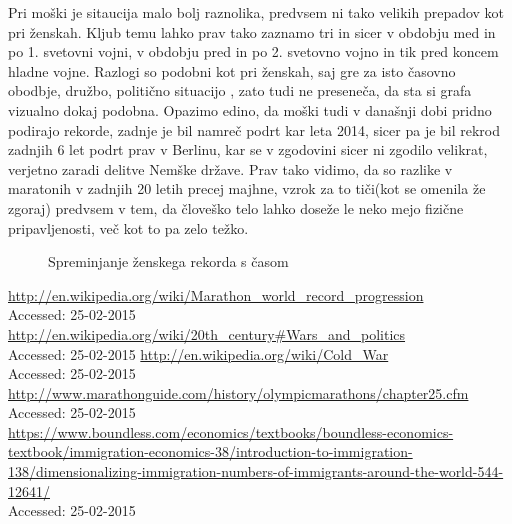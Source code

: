 \documentclass[11pt,a4paper]{article}
\begin{document}
Pri moški je sitaucija malo bolj raznolika, predvsem ni tako velikih prepadov kot pri ženskah. Kljub temu lahko prav tako zaznamo tri in sicer v obdobju med in po 1. svetovni vojni, v obdobju pred in po 2. svetovno vojno in tik pred koncem hladne vojne. Razlogi so podobni kot pri ženskah, saj gre za isto časovno obodbje, družbo, politično situacijo , zato tudi ne preseneča, da sta si grafa vizualno dokaj podobna. Opazimo edino, da moški tudi v današnji dobi pridno podirajo rekorde, zadnje je bil namreč podrt kar leta 2014, sicer pa je bil rekrod zadnjih 6 let podrt prav v Berlinu, kar se v zgodovini sicer ni zgodilo velikrat, verjetno zaradi delitve Nemške države.
Prav tako vidimo, da so razlike v maratonih v zadnjih 20 letih precej majhne, vzrok za to tiči(kot se omenila že zgoraj) predvsem v tem, da človeško telo lahko doseže le neko mejo fizične pripavljenosti, več kot to pa zelo težko.

\begin{figure}[H]
  \caption{Spreminjanje ženskega rekorda s časom}
  \label{fig:Slika 5}
\end{figure}

\newpage
\begin{thebibliography}{4}
  \url{http://en.wikipedia.org/wiki/Marathon_world_record_progression}\\
  {Accessed: 25-02-2015}
  \url{http://en.wikipedia.org/wiki/20th_century#Wars_and_politics}\\
  {Accessed: 25-02-2015}
  \url{http://en.wikipedia.org/wiki/Cold_War}\\
  {Accessed: 25-02-2015}
  \url{http://www.marathonguide.com/history/olympicmarathons/chapter25.cfm}\\
  {Accessed: 25-02-2015}
  \url{ https://www.boundless.com/economics/textbooks/boundless-economics-textbook/immigration-economics-38/introduction-to-immigration-138/dimensionalizing-immigration-numbers-of-immigrants-around-the-world-544-12641/}\\
  {Accessed: 25-02-2015}
 

\end{thebibliography}
\end{document}

